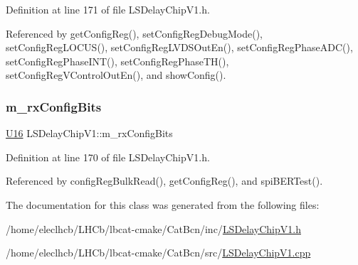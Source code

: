 Definition at line 171 of file L\+S\+Delay\+Chip\+V1.\+h.



Referenced by get\+Config\+Reg(), set\+Config\+Reg\+Debug\+Mode(), set\+Config\+Reg\+L\+O\+C\+U\+S(), set\+Config\+Reg\+L\+V\+D\+S\+Out\+En(), set\+Config\+Reg\+Phase\+A\+D\+C(), set\+Config\+Reg\+Phase\+I\+N\+T(), set\+Config\+Reg\+Phase\+T\+H(), set\+Config\+Reg\+V\+Control\+Out\+En(), and show\+Config().

\mbox{\label{classLSDelayChipV1_ae049797212539b231b9722ae69a0491d}} 
\subsubsection{\texorpdfstring{m\+\_\+rx\+Config\+Bits}{m\_rxConfigBits}}
{\footnotesize\ttfamily \hyperlink{ICECALv3_8h_adf928e51a60dba0df29d615401cc55a8}{U16} L\+S\+Delay\+Chip\+V1\+::m\+\_\+rx\+Config\+Bits\hspace{0.3cm}{\ttfamily [private]}}



Definition at line 170 of file L\+S\+Delay\+Chip\+V1.\+h.



Referenced by config\+Reg\+Bulk\+Read(), get\+Config\+Reg(), and spi\+B\+E\+R\+Test().



The documentation for this class was generated from the following files\+:\begin{DoxyCompactItemize}
\item 
/home/eleclhcb/\+L\+H\+Cb/lbcat-\/cmake/\+Cat\+Bcn/inc/\hyperlink{LSDelayChipV1_8h}{L\+S\+Delay\+Chip\+V1.\+h}\item 
/home/eleclhcb/\+L\+H\+Cb/lbcat-\/cmake/\+Cat\+Bcn/src/\hyperlink{LSDelayChipV1_8cpp}{L\+S\+Delay\+Chip\+V1.\+cpp}\end{DoxyCompactItemize}
